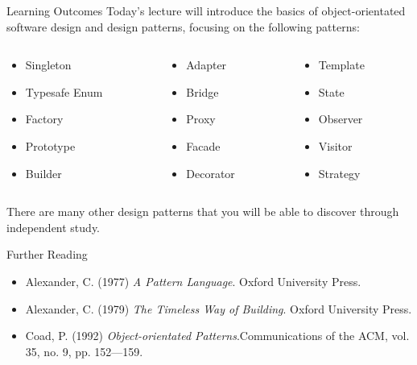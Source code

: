 \begin{frame}{Learning Outcomes}
	Today's lecture will introduce the basics of object-orientated software design and design patterns, focusing on
	the following patterns:
	
	\vspace{2ex}
	
	\begin{columns}[onlytextwidth]
		\begin{column}{0.33\textwidth}
			\begin{itemize}
				\item Singleton
				\item Typesafe Enum
				\item Factory
				\item Prototype
				\item Builder
			\end{itemize}
		\end{column}
		\begin{column}{0.33\textwidth}
			\begin{itemize}
				\item Adapter
				\item Bridge
				\item Proxy
				\item Facade
				\item Decorator
			\end{itemize}
		\end{column}
		\begin{column}{0.33\textwidth}
			\begin{itemize}
				\item Template
				\item State
				\item Observer
				\item Visitor				
				\item Strategy
			\end{itemize}
		\end{column}
	\end{columns}
	
	\vspace{3ex}
	 
	There are many other design patterns that you will be able to discover through independent study.
	
\end{frame}

\begin{frame}{Further Reading}
	\begin{itemize}
		\item Alexander, C. (1977) \textit{A Pattern Language}. Oxford University Press.	
		\vspace{1ex}
		\item Alexander, C. (1979) \textit{The Timeless Way of Building}. Oxford University Press.
		\vspace{1ex}
		\item Coad, P. (1992) \textit{Object-orientated Patterns}.Communications of the ACM, vol. 35, no. 9, pp. 152---159.
	\end{itemize}
\end{frame}

